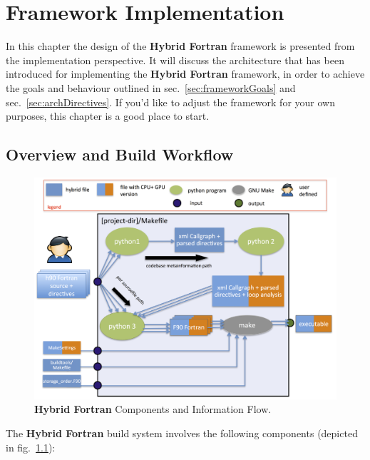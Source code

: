 \chapter{Framework Implementation} \label{cha:implementation}
In this chapter the design of the \textbf{Hybrid Fortran} framework is presented from the implementation perspective. It will discuss the architecture that has been introduced for implementing the \textbf{Hybrid Fortran} framework, in order to achieve the goals and behaviour outlined in sec.~\ref{sec:frameworkGoals} and sec.~\ref{sec:archDirectives}. If you'd like to adjust the framework for your own purposes, this chapter is a good place to start.

\section{Overview and Build Workflow} \label{sub:buildSystem}

\begin{figure}[htpb]
	\centering
	\includegraphics[width=14cm]{figures/hybridCUDAInformationFlow}
	\caption[Hybrid Fortran Components]{\textbf{Hybrid Fortran} Components and Information Flow.}
	\label{figure:hybridCUDAComponentsAndInfoFlow}
\end{figure}

The \textbf{Hybrid Fortran} build system involves the following components (depicted in fig.~\ref{figure:hybridCUDAComponentsAndInfoFlow}):

